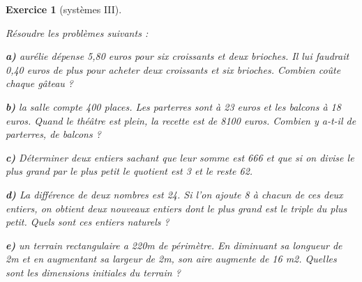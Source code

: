 \documentclass [10pt,a4paper] {article}
\newtheorem{exo}{Exercice}
\begin{document}
\begin{exo}[systèmes III]

\textcolor{white}{s}

Résoudre les problèmes suivants :
\vspace{0.25cm}

{\bfseries a)} aurélie dépense 5,80 euros pour six croissants et deux brioches. Il lui faudrait 0,40 euros de plus pour acheter deux croissants et six brioches.
Combien coûte chaque gâteau ?
\vspace{0.25cm}

{\bfseries b)} la salle compte 400 places. Les parterres sont à 23 euros et les balcons à 18 euros. Quand le théâtre est plein, la recette est de 8100 euros.
Combien y a-t-il de parterres, de balcons ?
\vspace{0.25cm}

{\bfseries c)} Déterminer deux entiers sachant que leur somme est 666 et que si on divise le plus grand par le plus petit le quotient est 3 et le reste 62.
\vspace{0.25cm}

{\bfseries d)} La différence de deux nombres est 24. Si l’on ajoute 8 à chacun de ces deux entiers, on obtient deux nouveaux entiers dont le plus grand est le triple du plus petit.
Quels sont ces entiers naturels ?
\vspace{0.25cm}

{\bfseries e)} un terrain rectangulaire a 220m de périmètre. En diminuant sa longueur de 2m et en augmentant sa largeur de 2m, son aire augmente de 16 m2.
Quelles sont les dimensions initiales du terrain ?
\end{exo}
\vspace{0.25cm}
\end{document}
